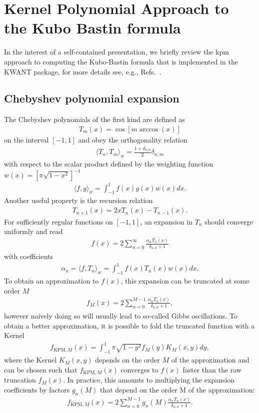 \documentclass[aps,prb,amsmath,amssymb,twocolumn, superscriptaddress]{revtex4-2}
\begin{document}
\section{Kernel Polynomial Approach to the Kubo Bastin formula} 
In the interest of a self-contained presentation, we briefly review the \gls{kpm} approach to computing the Kubo-Bastin formula that is implemented in the KWANT package, for more details see, e.g., Refs.~\cite{Kubo_Bastin_KPM_1_App, Kubo_Bastin_KPM_2_App, KPM_Review_App}.

\subsection{Chebyshev polynomial expansion}
The Chebyshev polynomials of the first kind are defined as
\begin{align}
T_m(x) = \cos [m \arccos(x)]
\end{align}
on the interval $[-1, 1]$ and obey the orthogonality relation
\begin{align}
\langle T_n , T_m \rangle_w = \frac{1 + \delta_{n,0}}{2} \delta_{n,m}
\end{align}
with respect to the scalar product defined by the weighting function $w(x) = [\pi \sqrt{1-x^2}]^{-1}$
\begin{align}
\langle f , g \rangle_w = \int_{-1}^1 f(x) g(x) w(x) dx.
\end{align}
Another useful property is the recursion relation
\begin{align}
T_{n+1}(x) = 2x T_n(x) - T_{n-1}(x). \label{Eqn:T_n_recursion}
\end{align}
For sufficiently regular functions on $[-1,1]$, an expansion in $T_n$ should converge uniformly and read
\begin{align}
f(x) = 2 \sum_{n = 0}^\infty \frac{\alpha_n T_n(x)}{\delta_{n,0} + 1}
\end{align}
with coefficients
\begin{align}
\alpha_n = \langle f, T_n \rangle_w =  \int_{-1}^1  f(x) T_n(x) w(x) dx. \label{Eqn:KPM_coefficients}
\end{align}
To obtain an approximation to $f(x)$, this expansion can be truncated at some order $M$
\begin{align}
f_M(x) = 2 \sum_{n = 0}^{M-1}  \frac{\alpha_n T_n(x)}{\delta_{n,0} + 1},
\end{align}
however naively doing so will usually lead to so-called Gibbs oscillations. To obtain a better approximation, it is possible to fold the truncated function with a Kernel
\begin{align}
f_{\text{KPM},M}(x) = \int_{-1}^1 \pi \sqrt{1 - y^2} f_M(y) K_M(x, y) dy, 
\end{align} 
where the Kernel $K_M(x, y)$ depends on the order $M$ of the approximation and can be chosen such that $f_{\text{KPM},M}(x)$ converges to $f(x)$ faster than the raw truncation $f_M(x)$. In practice, this amounts to multiplying the expansion coefficients by factors $g_n(M)$ that depend on the order M of the approximation:
\begin{align}
f_{\text{KPM},M}(x) = 2  \sum_{n = 0}^{M-1} g_n(M) \frac{\alpha_n T_n(x)}{\delta_{n,0} + 1}. \label{Eqn:KPM_expansion}
\end{align} 
\end{document}
